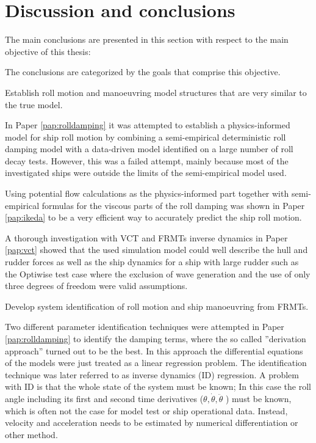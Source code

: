 \chapter{Discussion and conclusions\label{ch:conclusions}}

The main conclusions are presented in this section with respect to the main objective of this thesis:
\begin{tcolorbox}[sharp corners,title=Objective]
\objective
\end{tcolorbox}
\vspace{0.3cm}
\noindent The conclusions are categorized by the goals that comprise this objective.

\begin{tcolorbox}[sharp corners,title=RO1]
Establish roll motion and manoeuvring model structures that are very similar to the true model.
\end{tcolorbox}
In Paper \ref{pap:rolldamping} it was attempted to establish a physics-informed model for ship roll motion by combining a semi-empirical deterministic roll damping model with a data-driven model identified on a large number of roll decay tests. However, this was a failed attempt, mainly because most of the investigated ships were outside the limits of the semi-empirical model used.  

Using potential flow calculations as the physics-informed part together with semi-empirical formulas for the viscous parts of the roll damping was shown in Paper \ref{pap:ikeda} to be a very efficient way to accurately predict the ship roll motion.

A thorough investigation with VCT and FRMTs inverse dynamics in Paper \ref{pap:vct} showed that the used simulation model could well describe the hull and rudder forces as well as the ship dynamics for a ship with large rudder such as the Optiwise test case where the exclusion of wave generation and the use of only three degrees of freedom were valid assumptions. 

\begin{tcolorbox}[sharp corners,title=RO2]
Develop system identification of roll motion and ship manoeuvring from FRMTs.
\end{tcolorbox}
Two different parameter identification techniques were attempted in Paper \ref{pap:rolldamping} to identify the damping terms, where the so called ''derivation approach'' turned out to be the best. In this approach the differential equations of the models were just treated as a linear regression problem. The identification technique was later referred to as inverse dynamics (ID) regression. A problem with ID is that the whole state of the system must be known; In this case the roll angle including its first and second time derivatives ($\theta,\dot{\theta},\ddot{\theta}$ ) must be known, which is often not the case for model test or ship operational data. Instead, velocity and acceleration needs to be estimated by numerical differentiation or other method.

